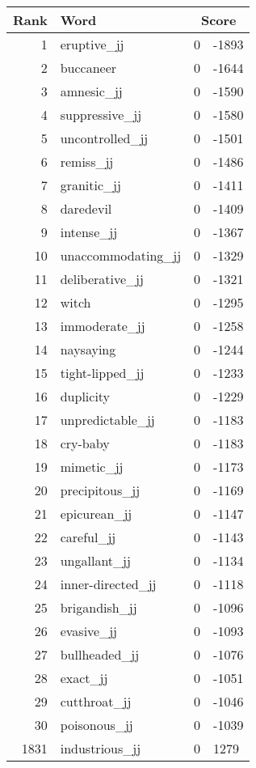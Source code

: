 \begin{longtable}[!htbp]{| rlr@{.}l |}
    \hline
    \textbf{Rank} & \textbf{Word} & \multicolumn{2}{c|}{\textbf{Score}} \\
    \hline
    \endhead
    1 & eruptive\_jj & 0 & -1893 \\
    2 & buccaneer & 0 & -1644 \\
    3 & amnesic\_jj & 0 & -1590 \\
    4 & suppressive\_jj & 0 & -1580 \\
    5 & uncontrolled\_jj & 0 & -1501 \\
    6 & remiss\_jj & 0 & -1486 \\
    7 & granitic\_jj & 0 & -1411 \\
    8 & daredevil & 0 & -1409 \\
    9 & intense\_jj & 0 & -1367 \\
    10 & unaccommodating\_jj & 0 & -1329 \\
    11 & deliberative\_jj & 0 & -1321 \\
    12 & witch & 0 & -1295 \\
    13 & immoderate\_jj & 0 & -1258 \\
    14 & naysaying & 0 & -1244 \\
    15 & tight-lipped\_jj & 0 & -1233 \\
    16 & duplicity & 0 & -1229 \\
    17 & unpredictable\_jj & 0 & -1183 \\
    18 & cry-baby & 0 & -1183 \\
    19 & mimetic\_jj & 0 & -1173 \\
    20 & precipitous\_jj & 0 & -1169 \\
    21 & epicurean\_jj & 0 & -1147 \\
    22 & careful\_jj & 0 & -1143 \\
    23 & ungallant\_jj & 0 & -1134 \\
    24 & inner-directed\_jj & 0 & -1118 \\
    25 & brigandish\_jj & 0 & -1096 \\
    26 & evasive\_jj & 0 & -1093 \\
    27 & bullheaded\_jj & 0 & -1076 \\
    28 & exact\_jj & 0 & -1051 \\
    29 & cutthroat\_jj & 0 & -1046 \\
    30 & poisonous\_jj & 0 & -1039 \\
    1831 & industrious\_jj & 0 & 1279 \\

\end{longtable}
